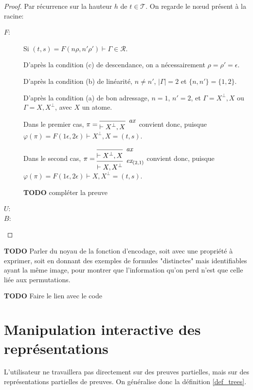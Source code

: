 \documentclass[11pt,a4paper]{article}
\theoremstyle{plain}
\theoremstyle{definition}
\theoremstyle{remark}
\newcommand*{\orth}{^\perp}
\newcommand*{\axv}[1]{\infer{0}[\ensuremath{\mathit{ax}}]{\vdash #1}}
\newcommand*{\permv}[2]{\infer{1}[\ensuremath{\textit{ex}_{#1}}]{\vdash #2}}
\newcommand*{\someproof}{\pi}
\newcommand*{\sequent}{\Gamma}
\newcommand*{\size}[1]{\mathopen{|}#1\mathclose{|}}
\newcommand*{\trees}{\ensuremath{\mathcal{T}}}
\newcommand*{\representations}{\ensuremath{\mathcal{R}}}
\newcommand*{\encode}{\ensuremath{\varphi}}
\newcommand*{\height}{\ensuremath{h}}
\newcommand*{\todo}{{\normalfont \textbf{TODO}} }
\begin{document}
\begin{proof}
Par récurrence sur la hauteur $\height$ de $t \in \trees$. On regarde le n\oe ud présent à la racine:
\begin{description}
    \item[$F$:]
    Si $(t, s) = F(n\rho, n'\rho') \vdash \sequent \in \representations$.

    D'après la condition (c) de descendance, on a nécessairement $\rho = \rho' = \epsilon$.

    D'après la condition (b) de linéarité, $n \neq n'$, $\size{\sequent} = 2$ et $\{n, n'\} = \{1, 2\}$.

    D'après la condition (a) de bon adressage, $n = 1$, $n' = 2$, et $\sequent = X\orth, X$ ou $\sequent = X, X\orth$, avec $X$ un atome.

    Dans le premier cas,
    $\someproof = \begin{prooftree}
            \axv{X\orth, X}
        \end{prooftree}$ convient donc, puisque $\encode \left( \someproof \right) = F(1 \epsilon, 2 \epsilon) \vdash X\orth, X = (t,s)$.

    Dans le second cas,
    $\someproof = \begin{prooftree}
            \axv{X\orth, X}
            \permv{(2, 1)}{X, X\orth}
        \end{prooftree}$ convient donc, puisque $\encode \left( \someproof \right) = F(1 \epsilon, 2 \epsilon) \vdash X, X\orth = (t,s)$.

     \todo{compléter la preuve}
     
    \item[$U$:] 

    \item[$B$:] 
  \end{description}
\end{proof}

\todo{Parler du noyau de la fonction d'encodage, soit avec une propriété à exprimer, soit en donnant des exemples de formules "distinctes" mais identifiables ayant la même image, pour montrer que l'information qu'on perd n'est que celle liée aux permutations.}

\todo{Faire le lien avec le code}

\section{Manipulation interactive des représentations}
L'utilisateur ne travaillera pas directement sur des preuves partielles, mais sur des représentations partielles de preuves. On généralise donc la définition \ref{def_trees}.
\end{document}
